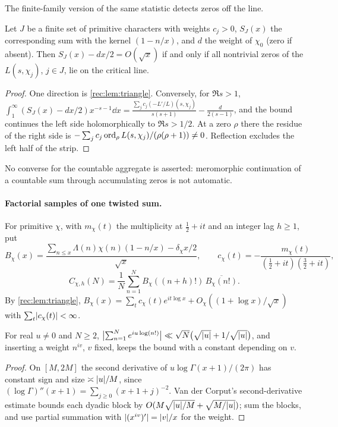 The finite-family version of the same statistic detects zeros off the line.

\begin{proposition}\label{rec:prop:finiteconverse}
Let $J$ be a finite set of primitive characters with weights $c_j>0$, $S_J(x)$ the corresponding
sum with the kernel $(1-n/x)$, and $d$ the weight of $\chi_0$ (zero if absent). Then
$S_J(x)-dx/2=O(\sqrt x)$ if and only if all nontrivial zeros of the $L(s,\chi_j)$, $j\in J$, lie on
the critical line.
\end{proposition}

\begin{proof}
One direction is \cref{rec:lem:triangle}. Conversely, for $\Re s>1$,
$\int_1^\infty(S_J(x)-dx/2)x^{-s-1}\dd x=\frac{\sum_jc_j(-L'/L)(s,\chi_j)}{s(s+1)}-\frac d{2(s-1)}$, and the
bound continues the left side holomorphically to $\Re s>1/2$. At a zero $\rho$ there the residue
of the right side is $-\sum_jc_j\operatorname{ord}_\rho L(s,\chi_j)/(\rho(\rho+1))\ne0$. Reflection excludes the
left half of the strip.
\end{proof}

No converse for the countable aggregate is asserted: meromorphic continuation of a countable sum
through accumulating zeros is not automatic.

\paragraph{Factorial samples of one twisted sum.}
For primitive $\chi$, with $m_\chi(t)$ the multiplicity at $\tfrac12+it$ and an integer lag
$h\ge1$, put
\[
 B_\chi(x)=\frac{\sum_{n\le x}\Lambda(n)\chi(n)(1-n/x)-\delta_\chi x/2}{\sqrt x},\qquad
 c_\chi(t)=-\frac{m_\chi(t)}{(\tfrac12+it)(\tfrac32+it)},
\]
\[
 C_{\chi,h}(N)=\frac1N\sum_{n=1}^NB_\chi((n+h)!)\,\overline{B_\chi(n!)}.
\]
By \cref{rec:lem:triangle}, $B_\chi(x)=\sum_tc_\chi(t)e^{it\log x}+O_\chi((1+\log x)/\sqrt x)$ with
$\sum_t\lvert c_\chi(t)\rvert<\infty$.

\begin{lemma}\label{rec:lem:factorial}
For real $u\ne0$ and $N\ge2$,
$\bigl\lvert\sum_{n=1}^Ne^{iu\log(n!)}\bigr\rvert\ll\sqrt N\bigl(\sqrt{\lvert u\rvert}+1/\sqrt{\lvert u\rvert}\bigr)$, and
inserting a weight $n^{iv}$, $v$ fixed, keeps the bound with a constant depending on $v$.
\end{lemma}

\begin{proof}
On $[M,2M]$ the second derivative of $u\log\Gamma(x+1)/(2\pi)$ has constant sign and size
$\asymp\lvert u\rvert/M$, since $(\log\Gamma)''(x+1)=\sum_{j\ge0}(x+1+j)^{-2}$. Van der Corput's
second-derivative estimate bounds each dyadic block by $O(M\sqrt{\lvert u\rvert/M}+\sqrt{M/\lvert u\rvert})$; sum the
blocks, and use partial summation with $\lvert(x^{iv})'\rvert=\lvert v\rvert/x$ for the weight.
\end{proof}

